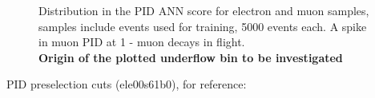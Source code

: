 \begin{figure}
  \label{fig:pid_training_2}
  \caption{
    Distribution in the PID ANN score for electron and muon samples, samples include events used for training,
    5000 events each. A spike in muon PID at 1  - muon decays in flight. \\ 
    {\color{red} \bf Origin of the plotted underflow bin to be investigated}
  }
\end{figure}


PID preselection cuts (ele00s61b0), for reference:

